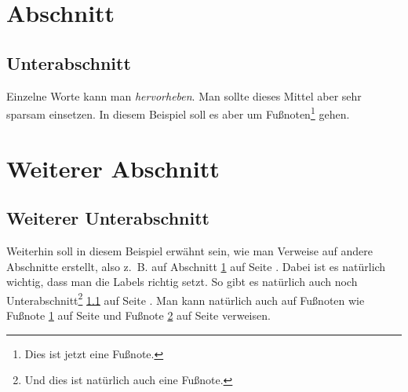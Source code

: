 \documentclass[a4paper, 11pt]{article}
\begin{document}
\section{Abschnitt}
\label{sec:abschnitt}

\subsection{Unterabschnitt}
\label{subsec:unterabschnitt}

Einzelne Worte kann man \emph{hervorheben}. Man sollte dieses Mittel aber sehr
sparsam einsetzen. In diesem Beispiel soll es aber um
Fußnoten\footnote{\label{foot:1}Dies ist jetzt eine Fußnote.} gehen.

\newpage

\section{Weiterer Abschnitt}

\subsection{Weiterer Unterabschnitt}

Weiterhin soll in diesem Beispiel erwähnt sein, wie man Verweise auf andere
Abschnitte erstellt, also z.~B. auf Abschnitt \ref{sec:abschnitt} auf Seite
\pageref{sec:abschnitt}. Dabei ist es natürlich wichtig, dass man die Labels
richtig setzt. So gibt es natürlich auch noch
Unterabschnitt\footnote{\label{foot:2}Und dies ist natürlich auch eine Fußnote.}
\ref{subsec:unterabschnitt} auf Seite \pageref{subsec:unterabschnitt}. Man kann
natürlich auch auf Fußnoten wie Fußnote \ref{foot:1} auf Seite \pageref{foot:1}
und Fußnote \ref{foot:2} auf Seite \pageref{foot:2} verweisen.

\end{document}
